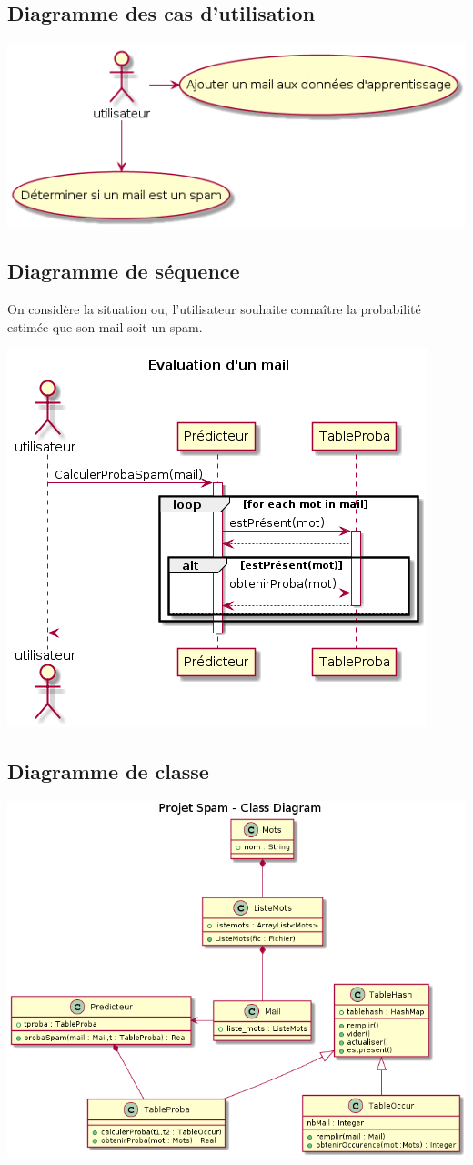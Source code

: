 \documentclass{article}
\begin{document}
\subsection{Diagramme des cas d'utilisation}

\includegraphics[scale=0.6]{diag_usecase.png}

\subsection{Diagramme de séquence}
On considère la situation ou, l'utilisateur souhaite connaître la probabilité estimée que son mail soit un spam.

\includegraphics[scale=0.7]{diag_sequence.png}

\subsection{Diagramme de classe}

\includegraphics[scale=0.5]{diag_classe.png}
\end{document}
